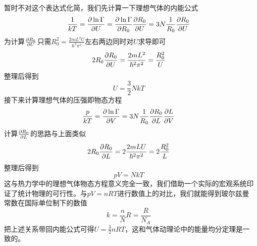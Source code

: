 \documentclass[../../main.tex]{subfiles}
\begin{document}
暂时不对这个表达式化简，我们先计算一下理想气体的内能公式
\begin{equation*}
    \frac{1}{kT}=\pdv{\ln\Gamma}{U}=\pdv{\ln\Gamma}{R_0}\pdv{R_0}{U}=3N\frac{1}{R_0}\pdv{R_0}{U}
\end{equation*}
为计算\(\pdv{R_0}{U}\)只需\(R_0^2=\frac{2mL^2U}{\hbar^2\pi^2}\)左右两边同时对\(U\)求导即可
\begin{equation*}
    2R_0\pdv{R_0}{U}=\frac{2mL^2}{\hbar^2\pi^2}=\frac{R_0^2}{U}
\end{equation*}
整理后得到
\begin{equation}
    U=\frac{3}{2}NkT
\end{equation}
接下来计算理想气体的压强即物态方程
\begin{equation*}
    \frac{p}{kT}=\pdv{\ln\Gamma}{V}=3N\frac{1}{R_0}\pdv{R_0}{L}\pdv{L}{V}
\end{equation*}
计算\(\pdv{R_0}{L}\)的思路与上面类似
\begin{equation*}
    2R_0\pdv{R_0}{L}=2\frac{2mLU}{\hbar^2\pi^2}=2\frac{R_0^2}{L}
\end{equation*}
整理后得到
\begin{equation}
    pV=NkT
\end{equation}
这与热力学中的理想气体物态方程意义完全一致，我们借助一个实际的宏观系统印证了统计物理的可行性。与\(pV=nRT\)进行数值上的对比，我们就能得到玻尔兹曼常数在国际单位制下的数值
\begin{equation}
    k=\frac{n}{N}R=\frac{R}{N_A}
\end{equation}
把上述关系带回内能公式可得\(U=\frac{3}{2}nRT\)，这和气体动理论中的能量均分定理是一致的。
\end{document}
